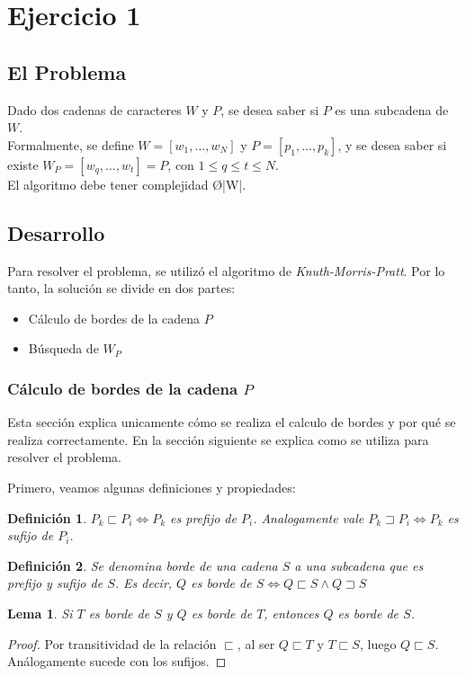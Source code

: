 \newtheorem*{definition}{Definición}
\newtheorem{lem}{Lema}
\section{Ejercicio 1}
\subsection{El Problema}
Dado dos cadenas de caracteres $W$ y $P$, se desea saber si $P$ es una subcadena de $W$.\\
Formalmente, se define $W = [w_1,...,w_N]$ y $P = [p_1,...,p_k]$, y se desea saber si existe $W_P = [w_q,...,w_t] = P$, con $1 \leq q \leq t \leq N$.\\
El algoritmo debe tener complejidad \O{|W|}.

\subsection{Desarrollo}
Para resolver el problema, se utilizó el algoritmo de \emph{Knuth-Morris-Pratt}.
Por lo tanto, la solución se divide en dos partes:
\begin{itemize}
	\item Cálculo de bordes de la cadena $P$
	\item Búsqueda de $W_P$
\end{itemize}

\subsubsection{Cálculo de bordes de la cadena $P$}
Esta sección explica unicamente cómo se realiza el calculo de bordes y por qué se realiza correctamente. En la sección siguiente se explica como se utiliza para resolver el problema.

Primero, veamos algunas definiciones y propiedades:
\begin{definition}
$P_k \sqsubset P_i \Leftrightarrow P_k$ es prefijo de $P_i$. Analogamente vale $P_k \sqsupset P_i \Leftrightarrow P_k$ es sufijo de $P_i$.
\end{definition}
\begin{definition}
Se denomina borde de una cadena $S$ a una subcadena que es prefijo y sufijo de $S$. Es decir, $Q$ es borde de $S \Leftrightarrow Q \sqsubset S \wedge Q \sqsupset S$
\end{definition}

\begin{lem}
Si $T$ es borde de $S$ y $Q$ es borde de $T$, entonces $Q$ es borde de $S$.
\end{lem}
\begin{proof}
Por transitividad de la relación $\sqsubset$, al ser $Q \sqsubset T$ y $T \sqsubset S$, luego $Q \sqsubset S$. Análogamente sucede con los sufijos.
\end{proof}

